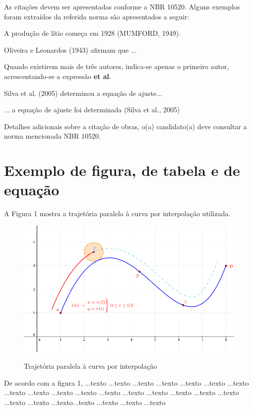 As citações devem ser apresentadas conforme a NBR 10520. Alguns exemplos foram extraídos da referida norma são apresentados a seguir:

A produção de lítio começa em 1928 (MUMFORD, 1949).

Oliveira e Leonardos (1943) afirmam que ...

Quando existirem mais de três autores, indica-se apenas o primeiro autor, acrescentando-se a expressão \textbf{et al}.

Silva et al. (2005) determinou a equação de ajuste...

... a equação de ajuste foi determinada (Silva et al., 2005)

Detalhes adicionais sobre a citação de obras, o(a) candidato(a) deve consultar a norma mencionada NBR 10520.



\section{Exemplo de figura, de tabela e de equação}

A Figura 1 mostra a trajetória paralela à curva por interpolação utilizada.

\begin{figure}[h]
	\centering
	{\caption{Trajetória paralela à curva por interpolação}}	
  	\includegraphics[scale=0.7]{imagens/FiguraTeste.png}
  	\vspace{-12pt}
  	\label{fig:FiguraTeste}
\end{figure}

De acordo com a figura 1, ...texto ...texto ...texto ...texto ...texto ...texto ...texto ...texto ...texto ...texto ...texto ...texto ...texto ...texto ...texto ...texto ...texto ...texto ...texto ...texto...texto ...texto ...texto ...texto


